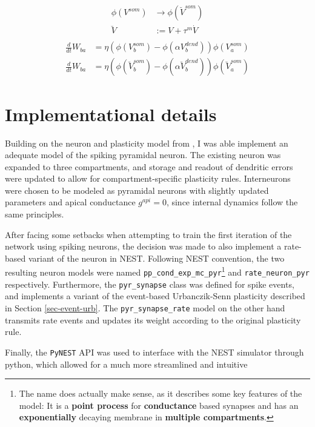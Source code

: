 \begin{align}
  \phi(V^{som}) & \rightarrow \phi(\breve{V}^{som}) \\
  \breve{V}     & := V + \tau^m \dot{V}             \\
\end{align}
\begin{align}
  \frac{d}{dt} W_{ba} & = \eta (\phi(V_b^{som}) - \phi(\alpha V_b^{dend})) \phi(V_a^{som})                         \\
  \frac{d}{dt} W_{ba} & = \eta (\phi(\breve{V}_b^{som}) - \phi(\alpha \breve{V}_b^{dend})) \phi(\breve{V}_a^{som})
\end{align}


\section{Implementational details}

Building on the neuron and plasticity model from \cite{Stapmanns2021}, I was able implement an adequate model of the
spiking pyramidal neuron. The existing neuron was expanded to three compartments, and storage and readout of dendritic
errors were updated  to allow for compartment-specific plasticity rules. Interneurons were chosen to be modeled as
pyramidal neurons with slightly updated parameters and apical conductance $g^{api}=0$, since internal dynamics follow 
the same principles.  

After facing some setbacks when attempting to train the first iteration of the network using spiking neurons, the
decision was made to also implement a rate-based variant of the neuron in NEST. Following NEST convention, the two
resulting neuron models were named \texttt{pp\_cond\_exp\_mc\_pyr}\footnote{The name does actually make sense, as it
describes some key features of the model: It is a \textbf{point process} for \textbf{conductance} based synapses and has
an \textbf{exponentially} decaying membrane in \textbf{multiple compartments}.} and \texttt{rate\_neuron\_pyr}
respectively. Furthermore, the \texttt{pyr\_synapse} class was defined for spike events, and implements a variant
of the event-based Urbanczik-Senn plasticity described in Section \ref{sec-event-urb}. The \texttt{pyr\_synapse\_rate}
model on the other hand transmits rate events and updates its weight according to the original plasticity rule.

Finally, the \texttt{PyNEST} API was used to interface with the NEST simulator through python, which allowed for a much 
more streamlined and intuitive 


